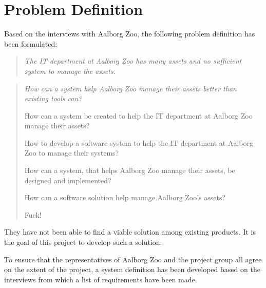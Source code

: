 \section{Problem Definition}
Based on the interviews with Aalborg Zoo, the following problem definition has been formulated:

\begin{quote}
    \textit{The IT department at Aalborg Zoo has many assets and no sufficient system to manage the assets.}
\end{quote}

\begin{quote}
    \textit{How can a system help Aalborg Zoo manage their assets better than existing tools can?}
    
    How can a system be created to help the IT department at Aalborg Zoo manage their assets?
    
    How to develop a software system to help the IT department at Aalborg Zoo to manage their systems?
    
    How can a system, that helps Aalborg Zoo manage their assets, be designed and implemented?
    
    How can a software solution help manage Aalborg Zoo's assets?
    
    Fuck!
\end{quote}

They have not been able to find a viable solution among existing products. It is the goal of this project to develop such a solution. 
\par
To ensure that the representatives of Aalborg Zoo and the project group all agree on the extent of the project, a system definition has been developed based on the interviews from which a list of requirements have been made.